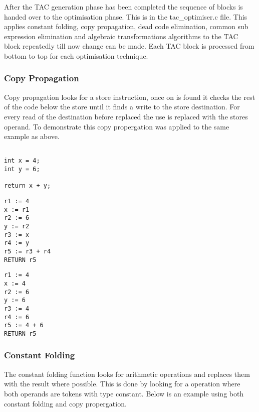 \documentclass{article}
\begin{document}
After the TAC generation phase has been completed the sequence of blocks is handed
over to the optimisation phase. This is in the tac\_optimiser.c file. This applies
constant folding, copy propagation, dead code elimination, common sub expression
elimination and algebraic transformations algorithms to the TAC block repeatedly till
now change can be made. Each TAC block is processed from bottom to top for each
optimisation technique.

\subsubsection{Copy Propagation}

Copy propagation looks for a store instruction, once on is found it checks the
rest of the code below the store until it finds a write to the store destination.
For every read of the destination before replaced the use is replaced with the
stores operand. To demonstrate this copy propergation was applied to the same example
as above.

\begin{minipage}{0.3\textwidth}
\begin{lstlisting}

int x = 4;
int y = 6;

return x + y;

\end{lstlisting}
\end{minipage}%
\begin{minipage}{0.3\textwidth}
\begin{lstlisting}
r1 := 4
x := r1
r2 := 6
y := r2
r3 := x
r4 := y
r5 := r3 + r4
RETURN r5

\end{lstlisting}
\end{minipage}%
\begin{minipage}{0.3\textwidth}
\begin{lstlisting}
r1 := 4
x := 4
r2 := 6
y := 6
r3 := 4
r4 := 6
r5 := 4 + 6
RETURN r5
\end{lstlisting}
\end{minipage}%

\subsubsection{Constant Folding}

The constant folding function looks for arithmetic operations and replaces them
with the result where possible. This is done by looking for a operation where both
operands are tokens with type constant. Below is an example using both constant
folding and copy propergation.
\end{document}
